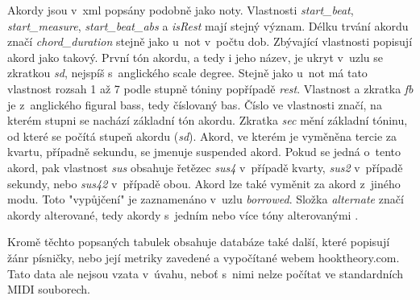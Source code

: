 Akordy jsou v~xml popsány podobně jako noty.
Vlastnosti \emph{start\_beat}, \emph{start\_measure}, \emph{start\_beat\_abs}
a \emph{isRest} mají stejný význam.
Délku trvání akordu značí \emph{chord\_duration} stejně jako u~not v~počtu dob.
Zbývající vlastnosti popisují akord jako takový.
První tón akordu, a tedy i jeho název, 
je ukryt v~uzlu se zkratkou \emph{sd},
nejspíš s~anglického scale degree.
Stejně jako u~not má tato vlastnost rozsah 1 až 7 podle stupně tóniny 
popřípadě \emph{rest}.
Vlastnost a zkratka \emph{fb} je z~anglického figural bass, 
tedy číslovaný bas. 
Číslo ve vlastnosti značí, 
na kterém stupni se nachází základní tón akordu\cite{kofron}.
Zkratka \emph{sec} mění základní tóninu,
od které se počítá stupeň akordu (\emph{sd}).
Akord, ve kterém je vyměněna tercie za kvartu, případně sekundu,
se jmenuje suspended akord.
Pokud se jedná o~tento akord, 
pak vlastnost \emph{sus} obsahuje řetězec \emph{sus4} v~případě kvarty,
\emph{sus2} v~případě sekundy, nebo \emph{sus42} v~případě obou\cite{SimplifyingSuspended}.
Akord lze také vyměnit za akord z~jiného modu.
Toto "vypůjčení" je zaznamenáno v~uzlu \emph{borrowed}.
Složka \emph{alternate} značí akordy alterované, 
tedy akordy s~jedním nebo více tóny alterovanými
\cite{SzkanderaAlterovane}.
\par
Kromě těchto popsaných tabulek obsahuje databáze také další,
které popisují žánr písničky, 
nebo její metriky zavedené a vypočítané webem hooktheory.com.
Tato data ale nejsou vzata v~úvahu, 
neboť s~nimi nelze počítat ve standardních MIDI souborech.

